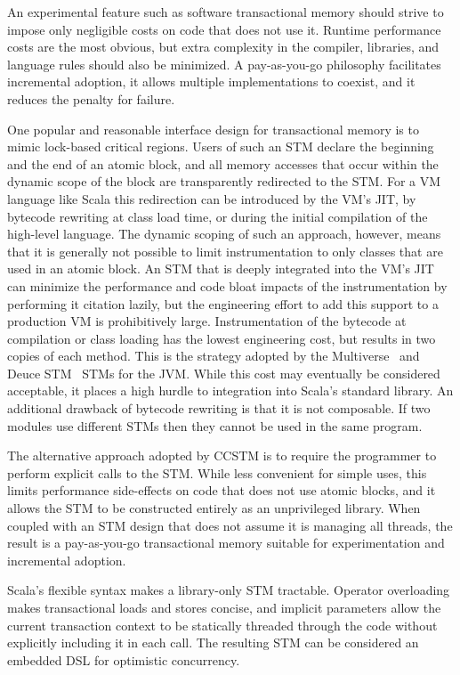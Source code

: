 
An experimental feature such as software transactional memory should
strive to impose only negligible costs on code that does not use it.
Runtime performance costs are the most obvious, but extra complexity in
the compiler, libraries, and language rules should also be minimized.
A pay-as-you-go philosophy facilitates incremental adoption, it allows
multiple implementations to coexist, and it reduces the penalty for
failure.

One popular and reasonable interface design for transactional memory
is to mimic lock-based critical regions.  Users of such an STM declare
the beginning and the end of an atomic block, and all memory accesses
that occur within the dynamic scope of the block are transparently
redirected to the STM.  For a VM language like Scala this redirection
can be introduced by the VM's JIT, by bytecode rewriting at class load
time, or during the initial compilation of the high-level language.
The dynamic scoping of such an approach, however, means that it is
generally not possible to limit instrumentation to only classes that
are used in an atomic block.  An STM that is deeply integrated into
the VM's JIT can minimize the performance and code bloat impacts of the
instrumentation by performing it citation lazily, but the engineering
effort to add this support to a production VM is prohibitively large.
Instrumentation of the bytecode at compilation or class loading has
the lowest engineering cost, but results in two copies of each method.
This is the strategy adopted by the Multiverse~\cite{multiverse} and Deuce
STM~\cite{deucestm} STMs for the JVM.  While this cost may eventually
be considered acceptable, it places a high hurdle to integration into
Scala's standard library.  An additional drawback of bytecode rewriting
is that it is not composable.  If two modules use different STMs then
they cannot be used in the same program.

The alternative approach adopted by CCSTM is to require the programmer to perform
explicit calls to the STM.  While less convenient for simple uses, this
limits performance side-effects on code that does not use atomic blocks, and it
allows the STM to be constructed entirely as an unprivileged library.
When coupled with an STM design that does not assume it is managing all
threads, the result is a pay-as-you-go transactional memory suitable
for experimentation and incremental adoption.

Scala's flexible syntax makes a library-only STM tractable.  Operator
overloading makes transactional loads and stores concise, and implicit
parameters allow the current transaction context to be statically
threaded through the code without explicitly including it in each call.
The resulting STM can be considered an embedded DSL
for optimistic concurrency.
